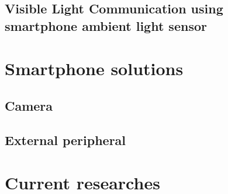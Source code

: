\subsection{Visible Light Communication using smartphone ambient light sensor}


\section{Smartphone solutions}

\subsection{Camera}
\subsection{External peripheral}


\section{Current researches}